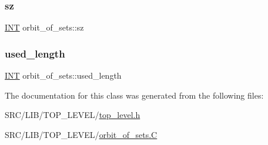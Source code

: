 \mbox{\label{classorbit__of__sets_a8b823e6f6f88c55c84bf1a1449f383ed}} 
\subsubsection{\texorpdfstring{sz}{sz}}
{\footnotesize\ttfamily \mbox{\hyperlink{galois_8h_a09fddde158a3a20bd2dcadb609de11dc}{I\+NT}} orbit\+\_\+of\+\_\+sets\+::sz}

\mbox{\label{classorbit__of__sets_a9acc3d48538bce4c7867fba8eee97b4a}} 
\subsubsection{\texorpdfstring{used\+\_\+length}{used\_length}}
{\footnotesize\ttfamily \mbox{\hyperlink{galois_8h_a09fddde158a3a20bd2dcadb609de11dc}{I\+NT}} orbit\+\_\+of\+\_\+sets\+::used\+\_\+length}



The documentation for this class was generated from the following files\+:\begin{DoxyCompactItemize}
\item 
S\+R\+C/\+L\+I\+B/\+T\+O\+P\+\_\+\+L\+E\+V\+E\+L/\mbox{\hyperlink{top__level_8h}{top\+\_\+level.\+h}}\item 
S\+R\+C/\+L\+I\+B/\+T\+O\+P\+\_\+\+L\+E\+V\+E\+L/\mbox{\hyperlink{orbit__of__sets_8_c}{orbit\+\_\+of\+\_\+sets.\+C}}\end{DoxyCompactItemize}

